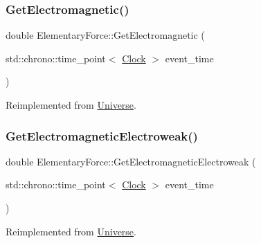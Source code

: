 \mbox{\label{classElementaryForce_a2c8bc3226f42710717775c73eee1644e}} 
\subsubsection{\texorpdfstring{Get\+Electromagnetic()}{GetElectromagnetic()}}
{\footnotesize\ttfamily double Elementary\+Force\+::\+Get\+Electromagnetic (\begin{DoxyParamCaption}\item[{std\+::chrono\+::time\+\_\+point$<$ \mbox{\hyperlink{universe_8h_a0ef8d951d1ca5ab3cfaf7ab4c7a6fd80}{Clock}} $>$}]{event\+\_\+time }\end{DoxyParamCaption})\hspace{0.3cm}{\ttfamily [virtual]}}



Reimplemented from \mbox{\hyperlink{classUniverse_a63b850ef3f3394313353109d222bf5d1}{Universe}}.

\mbox{\label{classElementaryForce_a58e503f2f3a7410f034a2a04bca560d1}} 
\subsubsection{\texorpdfstring{Get\+Electromagnetic\+Electroweak()}{GetElectromagneticElectroweak()}}
{\footnotesize\ttfamily double Elementary\+Force\+::\+Get\+Electromagnetic\+Electroweak (\begin{DoxyParamCaption}\item[{std\+::chrono\+::time\+\_\+point$<$ \mbox{\hyperlink{universe_8h_a0ef8d951d1ca5ab3cfaf7ab4c7a6fd80}{Clock}} $>$}]{event\+\_\+time }\end{DoxyParamCaption})\hspace{0.3cm}{\ttfamily [virtual]}}



Reimplemented from \mbox{\hyperlink{classUniverse_a9f099605c082e7fa755787a6a8cab7ba}{Universe}}.

\mbox{\label{classElementaryForce_af608447a2b6380142e2345ada11d1c32}} 
